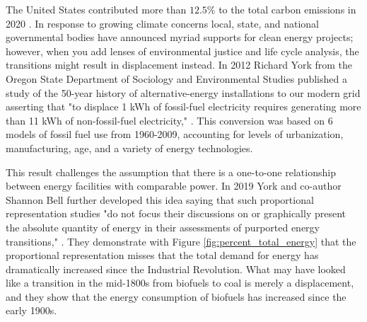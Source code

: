 The United States contributed more than $12.5\%$ to the total carbon emissions
in 2020 \cite{european_commission_joint_research_centre_ghg_2021}. In response
to growing climate concerns local, state, and national governmental bodies have
announced myriad supports for clean energy projects; however, when you add
lenses of environmental justice and life cycle analysis, the transitions might
result in displacement instead. In 2012 Richard York from the Oregon State
Department of Sociology and Environmental Studies published a study of the
50-year history of alternative-energy installations to our modern grid
asserting that "to displace 1 kWh of fossil-fuel electricity requires
generating more than 11 kWh of non-fossil-fuel electricity,"
\cite{york_alternative_2012}. This conversion was based on 6 models of fossil
fuel use from 1960-2009, accounting for levels of urbanization, manufacturing,
age, and a variety of energy technologies.

This result challenges the assumption that there is a one-to-one relationship
between energy facilities with comparable power. In 2019 York and co-author
Shannon Bell further developed this idea saying that such proportional
representation studies "do not focus their discussions on or graphically
present the absolute quantity of energy in their assessments of purported
energy transitions," \cite{york_energy_2019}. They demonstrate with Figure
\ref{fig:percent_total_energy} that the proportional representation misses that
the total demand for energy has dramatically increased since the Industrial
Revolution. What may have looked like a transition in the mid-1800s from
biofuels to coal is merely a displacement, and they show that the energy
consumption of biofuels has increased since the early 1900s.

